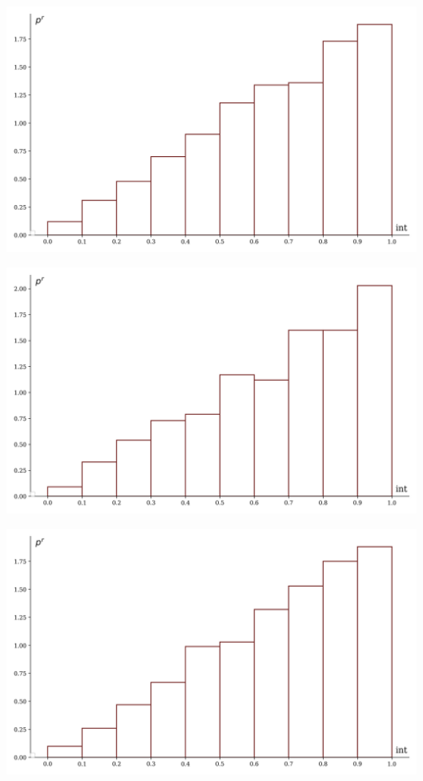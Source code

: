 \documentclass[a4paper, 14pt]{extarticle}
\begin{document}
\begin{minipage}[t]{0.25\textwidth}
  \includegraphics[width=\textwidth, height=\textheight, keepaspectratio]{sample1_hist}
\end{minipage}%
\begin{minipage}[t]{0.25\textwidth}
  \includegraphics[width=\textwidth, height=\textheight, keepaspectratio]{sample2_hist}
\end{minipage}%
\begin{minipage}[t]{0.25\textwidth}
  \includegraphics[width=\textwidth, height=\textheight, keepaspectratio]{sample3_hist}
\end{minipage}%
\end{document}
